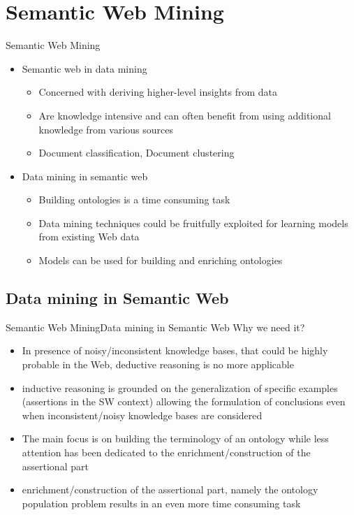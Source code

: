 \documentclass[10pt]{beamer}
\begin{document}
\section{Semantic Web Mining}

\begin{frame}{Semantic Web Mining}
\begin{itemize}
	\item Semantic web in data mining \cite{ristoski2016semantic}
	\begin{itemize}
		\item Concerned with deriving higher-level insights from data
		\item Are knowledge intensive and can often benefit from using additional knowledge from various sources
		\item Document classification, Document clustering \cite{berendt2004roadmap}
	\end{itemize}
	\item Data mining in semantic web \cite{d2010inductive}
	\begin{itemize}
		\item Building ontologies is a time consuming task
		\item Data mining techniques could be fruitfully exploited for learning models from existing Web data
		\item Models can be used for building and enriching ontologies 
	\end{itemize}
\end{itemize}
\end{frame}

\subsection{Data mining in Semantic Web}
\begin{frame}{Semantic Web Mining}{Data mining in Semantic Web}
	Why we need it? \cite{d2010inductive}
	 \begin{itemize} 
		\item In presence of noisy/inconsistent knowledge bases, that could be highly probable in  the Web, deductive reasoning is no more applicable 
		\item inductive reasoning is grounded on the generalization of specific examples (assertions in the SW context) allowing the formulation of conclusions even when inconsistent/noisy knowledge bases are considered
		\item The main focus is on   building the terminology of an ontology while less attention has been dedicated to the enrichment/construction of the assertional part
		\item enrichment/construction of the assertional part, namely the ontology population problem results in an even more time consuming task
	 \end{itemize}
\end{frame}
\end{document}
